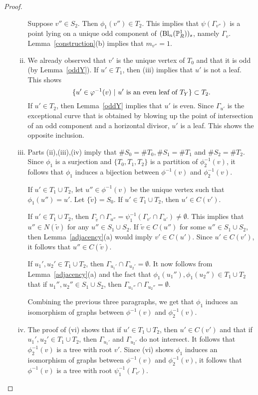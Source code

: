 \begin{proof}
\begin{enumerate}[\upshape (a)]
\begin{enumerate}[(i)]
  Suppose $v'' \in S_2$. Then $\phi_1(v'') \in T_2$. This implies that $\psi(\Gamma_{v''})$ is a point lying on a unique odd component of $(\mathrm{Bl}_n(\P^1_R))_s$, namely $\Gamma_v$. Lemma~\ref{construction}(b) implies that $m_{v''} = 1$.
  
  \item We already observed that $v'$ is the unique vertex of $T_0$ and that it is odd (by Lemma~\ref{oddY}). If $u' \in T_1$, then (iii) implies that $u'$ is not a leaf. This shows 
  \[  \{ u' \in \phi^{-1}(v) \ | \ u' \ \textup{is an even leaf of}\ T_Y \} \subset T_2 .\]
  If $u' \in T_2$, then Lemma~\ref{oddY} implies that $u'$ is even. Since $\Gamma_{u'}$ is the exceptional curve that is obtained by blowing up the point of intersection of an odd component and a horizontal divisor, $u'$ is a leaf. This shows the opposite inclusion. 
  
  \item Parts (ii),(iii),(iv) imply that $\# S_0 = \# T_0, \#S_1 = \# T_1$ and $\# S_2 = \# T_2$. Since $\phi_1$ is a surjection and $\{ T_0,T_1,T_2 \}$ is a partition of $\phi_2^{-1}(v)$, it follows that $\phi_1$ induces a bijection between $\phi^{-1}(v)$ and $\phi_2^{-1}(v)$. 
  
  If $u' \in T_1 \cup T_2$, let $u'' \in \phi^{-1}(v)$ be the unique vertex such that $\phi_1(u'') = u'$. Let $\{ \tilde{v} \} = S_0$. If $u' \in T_1 \cup T_2$, then $u' \in C(v')$. 
  
  If $u' \in T_1 \cup T_2$, then $\Gamma_{\tilde{v}} \cap \Gamma_{u''} = \psi_1^{-1}(\Gamma_{v'} \cap \Gamma_{u'}) \neq \emptyset$. This implies that $u'' \in N(\tilde{v})$ for any $u'' \in S_1 \cup S_2$. If $\tilde{v} \in C(u'')$ for some $u'' \in S_1 \cup S_2$, then Lemma~\ref{adjacency}(a) would imply $v' \in C(u')$. Since $u' \in C(v')$, it follows that $u'' \in C(\tilde{v})$. 
  
  If $u_1',u_2' \in T_1 \cup T_2$, then $\Gamma_{u_1'} \cap \Gamma_{u_2'} = \emptyset$. It now follows from Lemma~\ref{adjacency}(a) and the fact that $\phi_1(u_1''),\phi_1(u_2'') \in T_1 \cup T_2$ that if $u_1'',u_2'' \in S_1 \cup S_2$, then $\Gamma_{u_1''} \cap \Gamma_{u_2''} = \emptyset$. 
  
  Combining the previous three paragraphs, we get that $\phi_1$ induces an isomorphism of graphs between $\phi^{-1}(v)$ and $\phi_2^{-1}(v)$. 
  
  \item The proof of (vi) shows that if $u' \in T_1 \cup T_2$, then $u' \in C(v')$ and that if $u_1',u_2' \in T_1 \cup T_2$, then $\Gamma_{u_1'}$ and $\Gamma_{u_2'}$ do not intersect. It follows that $\phi_2^{-1}(v)$ is a tree with root $v'$. Since (vi) shows $\phi_1$ induces an isomorphism of graphs between $\phi^{-1}(v)$ and $\phi_2^{-1}(v)$, it follows that $\phi^{-1}(v)$ is a tree with root $\psi_1^{-1}(\Gamma_{v'})$.
  

\end{enumerate}
\end{enumerate}
\end{proof}
